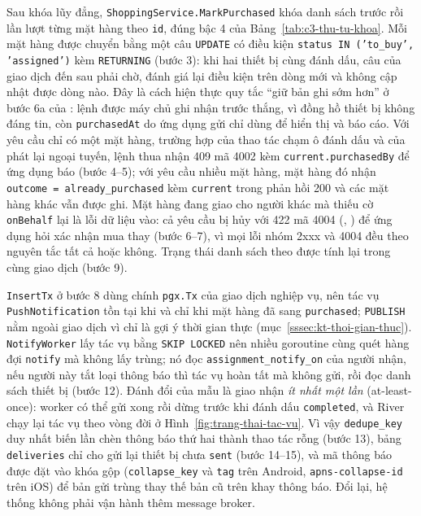 
Sau khóa lũy đẳng, \texttt{ShoppingService.MarkPurchased} khóa danh sách trước rồi lần lượt từng mặt hàng theo \texttt{id}, đúng bậc 4 của Bảng~\ref{tab:c3-thu-tu-khoa}. Mỗi mặt hàng được chuyển bằng một câu \texttt{UPDATE} có điều kiện \texttt{status IN ('to\_buy', 'assigned')} kèm \texttt{RETURNING} (bước 3): khi hai thiết bị cùng đánh dấu, câu của giao dịch đến sau phải chờ, đánh giá lại điều kiện trên dòng mới và không cập nhật được dòng nào. Đây là cách hiện thực quy tắc “giữ bản ghi sớm hơn” ở bước 6a của : lệnh được máy chủ ghi nhận trước thắng, vì đồng hồ thiết bị không đáng tin, còn \texttt{purchasedAt} do ứng dụng gửi chỉ dùng để hiển thị và báo cáo. Với yêu cầu chỉ có một mặt hàng, trường hợp của thao tác chạm ô đánh dấu và của phát lại ngoại tuyến, lệnh thua nhận 409 mã 4002 kèm \texttt{current.purchasedBy} để ứng dụng báo  (bước 4--5); với yêu cầu nhiều mặt hàng, mặt hàng đó nhận \texttt{outcome = already\_purchased} kèm \texttt{current} trong phản hồi 200 và các mặt hàng khác vẫn được ghi. Mặt hàng đang giao cho người khác mà thiếu cờ \texttt{onBehalf} lại là lỗi dữ liệu vào: cả yêu cầu bị hủy với 422 mã 4004 (, ) để ứng dụng hỏi xác nhận mua thay (bước 6--7), vì mọi lỗi nhóm 2xxx và 4004 đều theo nguyên tắc tất cả hoặc không. Trạng thái danh sách theo  được tính lại trong cùng giao dịch (bước 9).

\texttt{InsertTx} ở bước 8 dùng chính \texttt{pgx.Tx} của giao dịch nghiệp vụ, nên tác vụ \texttt{PushNotification} tồn tại khi và chỉ khi mặt hàng đã sang \texttt{purchased}; \texttt{PUBLISH} nằm ngoài giao dịch vì chỉ là gợi ý thời gian thực (mục~\ref{sssec:kt-thoi-gian-thuc}). \texttt{NotifyWorker} lấy tác vụ bằng \texttt{SKIP LOCKED} nên nhiều goroutine cùng quét hàng đợi \texttt{notify} mà không lấy trùng; nó đọc \texttt{assignment\_notify\_on} của người nhận, nếu người này tắt loại thông báo thì tác vụ hoàn tất mà không gửi, rồi đọc danh sách thiết bị (bước 12). Đánh đổi của mẫu là giao nhận \emph{ít nhất một lần} (at-least-once): worker có thể gửi xong rồi dừng trước khi đánh dấu \texttt{completed}, và River chạy lại tác vụ theo vòng đời ở Hình~\ref{fig:trang-thai-tac-vu}. Vì vậy \texttt{dedupe\_key} duy nhất biến lần chèn thông báo thứ hai thành thao tác rỗng (bước 13), bảng \texttt{deliveries} chỉ cho gửi lại thiết bị chưa \texttt{sent} (bước 14--15), và mã thông báo được đặt vào khóa gộp (\texttt{collapse\_key} và \texttt{tag} trên Android, \texttt{apns-collapse-id} trên iOS) để bản gửi trùng thay thế bản cũ trên khay thông báo. Đổi lại, hệ thống không phải vận hành thêm message broker.

